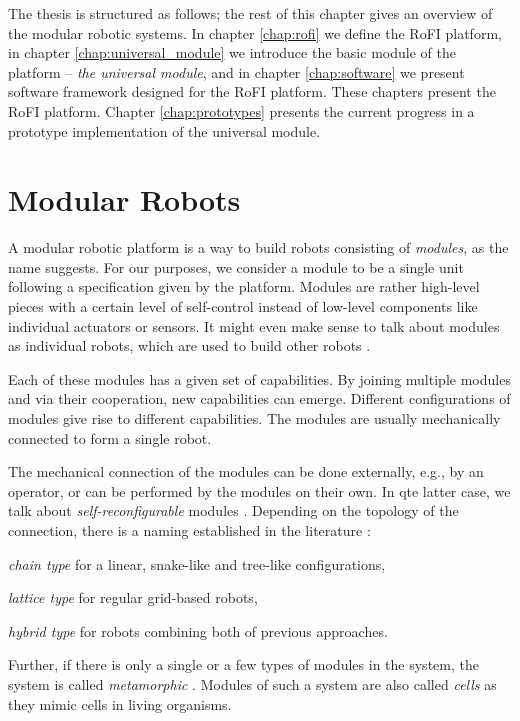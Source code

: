 The thesis is structured as follows; the rest of this chapter gives an overview
of the modular robotic systems. In chapter \ref{chap:rofi} we define the RoFI
platform, in chapter \ref{chap:universal_module} we introduce the basic module
of the platform -- \emph{the universal module}, and in chapter
\ref{chap:software} we present software framework designed for the RoFI
platform. These chapters present the RoFI platform. Chapter
\ref{chap:prototypes} presents the current progress in a prototype
implementation of the universal module.

\section{Modular Robots}

A modular robotic platform is a way to build robots consisting of
\emph{modules}, as the name suggests. For our purposes, we consider a module to
be a single unit following a specification given by the platform. Modules are
rather high-level pieces with a certain level of self-control instead of
low-level components like individual actuators or sensors. It might even make
sense to talk about modules as individual robots, which are used to build other
robots \cite{brunete_current_2017}.

Each of these modules has a given set of capabilities. By joining multiple
modules and via their cooperation, new capabilities can emerge. Different
configurations of modules give rise to different capabilities. The modules are
usually mechanically connected to form a single robot.

The mechanical connection of the modules can be done externally, e.g., by an
operator, or can be performed by the modules on their own. In qte latter case,
we talk about \emph{self-reconfigurable} modules \cite{brunete_current_2017}.
Depending on the topology of the connection, there is a naming established in
the literature \cite{brunete_current_2017}:
\begin{enumerate*}
    \item \emph{chain type} for a linear, snake-like and tree-like
    configurations,
    \item \emph{lattice type} for regular grid-based robots,
    \item \emph{hybrid type} for robots combining both of previous approaches.
\end{enumerate*}
Further, if there is only a single or a few types of modules in the system, the
system is called \emph{metamorphic} \cite{brunete_current_2017}. Modules of such
a system are also called \emph{cells} as they mimic cells in living organisms.

